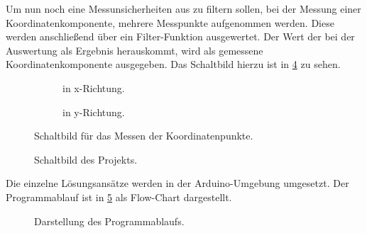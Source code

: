 Um nun noch eine Messunsicherheiten aus zu filtern sollen, bei der Messung einer Koordinatenkomponente, mehrere Messpunkte aufgenommen werden.
Diese werden anschließend über ein Filter-Funktion ausgewertet.
Der Wert der bei der Auswertung als Ergebnis herauskommt, wird als gemessene Koordinatenkomponente ausgegeben.
Das Schaltbild hierzu ist in \cref{fig:schaltbild} zu sehen.

\begin{figure}[ht!]
    \begin{subfigure}{0.49\textwidth}
        \centering
        
        \caption{in x-Richtung.}
        \label{fig:xlesen}
    \end{subfigure}
    \hfill
    \begin{subfigure}{0.49\textwidth}
        \centering
        
        \caption{in y-Richtung.}
        \label{fig:ylesen}
    \end{subfigure}
    \caption{Schaltbild für das Messen der Koordinatenpunkte.}
    \label{fig:xylesen}
\end{figure}
\begin{figure}[ht!]
    \centering
    
    \caption{Schaltbild des Projekts.}
    \label{fig:schaltbild}
\end{figure}
Die einzelne Lösungsansätze werden in der Arduino-Umgebung umgesetzt.
Der Programmablauf ist in \cref{fig:flowchart} als Flow-Chart dargestellt.

\begin{figure}
    \centering
    
    \caption{Darstellung des Programmablaufs.}
    \label{fig:flowchart}
\end{figure}

